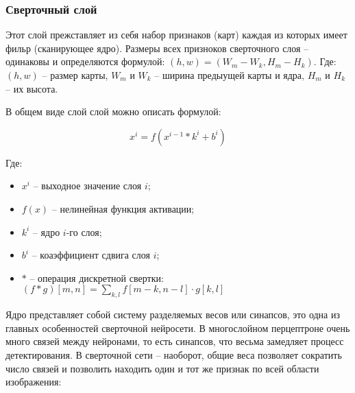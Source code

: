 \subsubsection{Сверточный слой}

Этот слой прежставляет из себя набор признаков (карт) каждая из которых имеет фильр (сканирующее ядро). Размеры всех призноков сверточного слоя -- одинаковы и определяются формулой: $(h,w) = (W_m-W_k, H_m-H_k)$. Где: $(h,w)$ -- размер карты, $W_m$ и $W_k$ -- ширина предыущей карты и ядра, $H_m$ и $H_k$ -- их высота.

В общем виде слой слой можно описать формулой:

$$
x^i = f(x^{i-1}*k^i+b^i)
$$

Где:
\begin{itemize}
    \item $x^i$ -- выходное значение слоя $i$;
    \item $f(x)$ -- нелинейная функция активации;
    \item $k^i$ -- ядро $i$-го слоя;
    \item $b^i$ -- коаэффициент сдвига слоя $i$;
    \item $*$ -- операция дискретной свертки: $(f*g)[m,n]=\sum_{k,l} f[m-k,n-l]\cdot g[k,l]$
\end{itemize}


Ядро представляет собой систему разделяемых весов или синапсов, это одна из главных особенностей сверточной нейросети. В многослойном перцептроне очень много связей между нейронами, то есть синапсов, что весьма замедляет процесс детектирования. В сверточной сети -- наоборот, общие веса позволяет сократить число связей и позволить находить один и тот же признак по всей области изображения:

